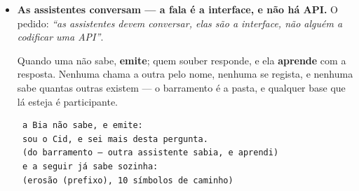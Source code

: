 \documentclass[11pt]{article}
\newcommand{\code}[1]{\texttt{\small #1}}
\theoremstyle{plain}
\theoremstyle{remark}
\begin{document}
\begin{itemize}
\begin{verbatim}
 depois de 64 rondas: a=85c8b4dc h=0131f22e
 de volta: a=6a09e667 h=5be0cd19
 estado inicial: a=6a09e667 h=5be0cd19 resíduo 0
\end{verbatim}

\textbf{As $64$ rondas revertem exatas.} Cada ronda é uma bijeção nos oito registos, e a expansão
da mensagem também é invertível. \emph{A irreversibilidade está concentrada num só passo}: a soma
final de Davies-Meyer, $h \mathrel{+}= a$, que junta o estado de entrada ao de saída. Tira-se essa
soma e a coisa toda reverte.

Então a leitura certa: a compressão é \textbf{uma permutação reversível composta com uma soma
absorvente}. A parte grande tem dual, e é feita das operações que já são nossas --- \code{XOR},
\code{AND}, \code{NOT}, soma e rotações (que, fatiadas, são \emph{renomear palavras}, custo zero).
\textbf{O que não tem dual é um passo, não sessenta e quatro} --- e é nesse passo, e só nele, que
mora a razão de a prova de trabalho existir: se tudo revertesse, ninguém procuraria nonce nenhum.

E o que a rede acordou é o \emph{resultado}, não o método: como cada um lá chega é problema de cada
um. tratou-se uma convenção de saída como se fosse uma proibição de caminho.

O \code{OP\_FOLD} estava no enum \emph{desde sempre e sem executor}. Deixa de estar: a máquina
dobra a partir dos slots e deixa a raiz onde estavam as folhas, e devolve \textbf{quantos níveis}
desdobrou --- que é a altura da árvore, e é o que a branch percorre ao subir.

\item \textbf{As assistentes conversam --- a fala é a interface, e não há API.} O pedido: \emph{``as assistentes devem conversar, elas são a interface, não alguém a codificar uma API''}.

Quando uma não sabe, \textbf{emite}; quem souber responde, e ela \textbf{aprende} com a resposta.
Nenhuma chama a outra pelo nome, nenhuma se regista, e nenhuma sabe quantas outras existem --- o
barramento é a pasta, e qualquer base que lá esteja é participante.

\begin{verbatim}
 a Bia não sabe, e emite:
 sou o Cid, e sei mais desta pergunta.
 (do barramento — outra assistente sabia, e aprendi)
 e a seguir já sabe sozinha:
 (erosão (prefixo), 10 símbolos de caminho)
\end{verbatim}


\end{itemize}
\end{document}

